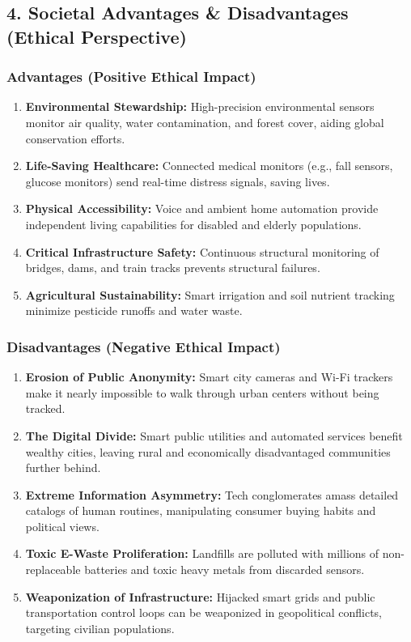 \subsection{4. Societal Advantages \& Disadvantages (Ethical Perspective)}

\subsubsection{Advantages (Positive Ethical Impact)}
\begin{enumerate}
  \item \textbf{Environmental Stewardship:} High-precision environmental sensors monitor air quality, water contamination, and forest cover, aiding global conservation efforts.
  \item \textbf{Life-Saving Healthcare:} Connected medical monitors (e.g., fall sensors, glucose monitors) send real-time distress signals, saving lives.
  \item \textbf{Physical Accessibility:} Voice and ambient home automation provide independent living capabilities for disabled and elderly populations.
  \item \textbf{Critical Infrastructure Safety:} Continuous structural monitoring of bridges, dams, and train tracks prevents structural failures.
  \item \textbf{Agricultural Sustainability:} Smart irrigation and soil nutrient tracking minimize pesticide runoffs and water waste.
\end{enumerate}

\subsubsection{Disadvantages (Negative Ethical Impact)}
\begin{enumerate}
  \item \textbf{Erosion of Public Anonymity:} Smart city cameras and Wi-Fi trackers make it nearly impossible to walk through urban centers without being tracked.
  \item \textbf{The Digital Divide:} Smart public utilities and automated services benefit wealthy cities, leaving rural and economically disadvantaged communities further behind.
  \item \textbf{Extreme Information Asymmetry:} Tech conglomerates amass detailed catalogs of human routines, manipulating consumer buying habits and political views.
  \item \textbf{Toxic E-Waste Proliferation:} Landfills are polluted with millions of non-replaceable batteries and toxic heavy metals from discarded sensors.
  \item \textbf{Weaponization of Infrastructure:} Hijacked smart grids and public transportation control loops can be weaponized in geopolitical conflicts, targeting civilian populations.
\end{enumerate}


